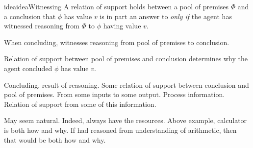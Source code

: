 \begin{note}
  \begin{restatable}[Witnessing]{idea}{ideaWitnessing}
    \label{idea:Witnessing}
    A relation of support holds between a pool of premises \(\Phi\) and a conclusion that \(\phi\) has value \(v\) is in part an answer to \qWhy{} \emph{only if} the agent has witnessed reasoning from \(\Phi\) to \(\phi\) having value \(v\).
  \end{restatable}

  When concluding, witnesses reasoning from pool of premises to conclusion.

  Relation of support between pool of premises and conclusion determines why the agent concluded \(\phi\) has value \(v\).

  Concluding, result of reasoning.
  Some relation of support between conclusion and pool of premises.
  From some inputs to some output.
  Process information.
  Relation of support from some of this information.

  May seem natural.
  Indeed, always have the resources.
  Above example, calculator is both how and why.
  If had reasoned from understanding of arithmetic, then that would be both how and why.
\end{note}


